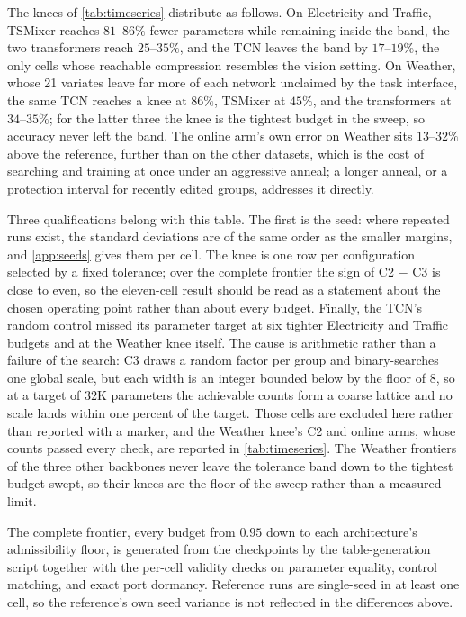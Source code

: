 \documentclass[10pt]{article}
\theoremstyle{paper}
\begin{document}
The knees of \cref{tab:timeseries} distribute as follows. On Electricity and Traffic, TSMixer reaches $81$--$86\%$ fewer parameters while remaining inside the band, the two transformers reach $25$--$35\%$, and the TCN leaves the band by $17$--$19\%$, the only cells whose reachable compression resembles the vision setting. On Weather, whose 21 variates leave far more of each network unclaimed by the task interface, the same TCN reaches a knee at $86\%$, TSMixer at $45\%$, and the transformers at $34$--$35\%$; for the latter three the knee is the tightest budget in the sweep, so accuracy never left the band. The online arm's own error on Weather sits $13$--$32\%$ above the reference, further than on the other datasets, which is the cost of searching and training at once under an aggressive anneal; a longer anneal, or a protection interval for recently edited groups, addresses it directly.

Three qualifications belong with this table. The first is the seed: where repeated runs exist, the standard deviations are of the same order as the smaller margins, and \cref{app:seeds} gives them per cell. The knee is one row per configuration selected by a fixed tolerance; over the complete frontier the sign of C2 $-$ C3 is close to even, so the eleven-cell result should be read as a statement about the chosen operating point rather than about every budget. Finally, the TCN's random control missed its parameter target at six tighter Electricity and Traffic budgets and at the Weather knee itself. The cause is arithmetic rather than a failure of the search: C3 draws a random factor per group and binary-searches one global scale, but each width is an integer bounded below by the floor of 8, so at a target of $32$K parameters the achievable counts form a coarse lattice and no scale lands within one percent of the target. Those cells are excluded here rather than reported with a marker, and the Weather knee's C2 and online arms, whose counts passed every check, are reported in \cref{tab:timeseries}. The Weather frontiers of the three other backbones never leave the tolerance band down to the tightest budget swept, so their knees are the floor of the sweep rather than a measured limit.

The complete frontier, every budget from $0.95$ down to each architecture's admissibility floor, is generated from the checkpoints by the table-generation script together with the per-cell validity checks on parameter equality, control matching, and exact port dormancy. Reference runs are single-seed in at least one cell, so the reference's own seed variance is not reflected in the differences above.
\end{document}
